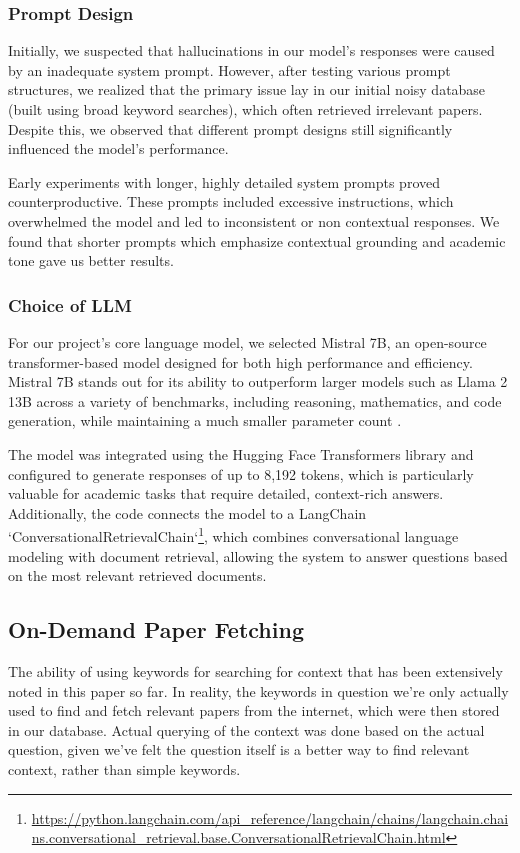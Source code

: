 \documentclass[fleqn,moreauthors,10pt]{ds_report}
\begin{document}
\subsubsection*{Prompt Design}

Initially, we suspected that hallucinations in our model’s responses were caused by an inadequate system prompt. However, after testing various prompt structures, we realized that the primary issue lay in our initial noisy database (built using broad keyword searches), which often retrieved irrelevant papers. Despite this, we observed that different prompt designs still significantly influenced the model’s performance.

Early experiments with longer, highly detailed system prompts proved counterproductive. These prompts included excessive instructions, which overwhelmed the model and led to inconsistent or non contextual responses. We found that shorter prompts which emphasize contextual grounding and academic tone gave us better results.

\subsubsection*{Choice of LLM}

For our project’s core language model, we selected Mistral 7B, an open-source transformer-based model designed for both high performance and efficiency. Mistral 7B stands out for its ability to outperform larger models such as Llama 2 13B across a variety of benchmarks, including reasoning, mathematics, and code generation, while maintaining a much smaller parameter count \cite{jiang2023mistral7b}.

The model was integrated using the Hugging Face Transformers library and configured to generate responses of up to 8,192 tokens, which is particularly valuable for academic tasks that require detailed, context-rich answers. Additionally, the code connects the model to a LangChain `ConversationalRetrievalChain`\footnote{\url{https://python.langchain.com/api_reference/langchain/chains/langchain.chains.conversational_retrieval.base.ConversationalRetrievalChain.html}}, which combines conversational language modeling with document retrieval, allowing the system to answer questions based on the most relevant retrieved documents.


\subsection*{On-Demand Paper Fetching}
The ability of using keywords for searching for context that has been extensively noted in this paper so far. In reality, the keywords in question we're only actually used to find and fetch relevant papers from the internet, which were then stored in our database. Actual querying of the context was done based on the actual question, given we've felt the question itself is a better way to find relevant context, rather than simple keywords.
\end{document}

